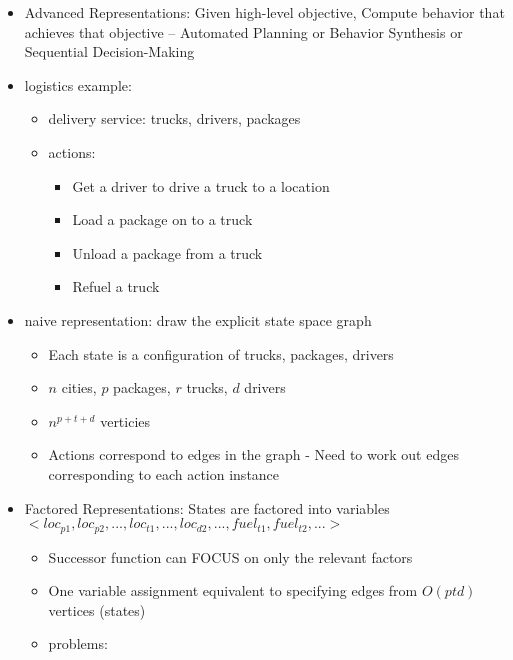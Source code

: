 \documentclass[10pt]{article}
\begin{document}
\begin{itemize}[label=\(\star\), leftmargin=1em, itemsep=-0.3em]

\item Advanced Representations: Given  high-level objective, Compute behavior that achieves that objective -- Automated Planning or Behavior Synthesis or Sequential Decision-Making
\item logistics example:
        \begin{itemize}[label=\(\star\), leftmargin=1em, itemsep=-0.2em]

            \item delivery service: trucks, drivers, packages
            \item actions:
                \begin{itemize}[label=\(\star\),  leftmargin=1em, itemsep=-0.2em]
                    \item  Get a driver to drive a truck to a location
                    \item Load a package on to a truck
                    \item Unload a package from a truck
                    \item Refuel a truck
                \end{itemize}
        \end{itemize}
\item naive representation: draw the explicit state space graph

        \begin{itemize}[label=\(\star\), leftmargin=1em, itemsep=-0.2em]
            \item Each state is a configuration of trucks, packages, drivers
            \item $n$ cities, $p$ packages, $r$ trucks, $d$ drivers
            \item $n^{p+t+d}$ verticies
            \item Actions correspond to edges in the graph - Need to work out edges corresponding to each action instance


        \end{itemize}

\item Factored Representations: States are factored into variables $<loc_{p1}, loc_{p2},..., loc_{t1},... ,  loc_{d2},..., fuel_{t1}, fuel_{t2}, ... >$

\begin{itemize}[label=\(\star\), leftmargin=1em, itemsep=-0.2em]
    \item  Successor function can FOCUS on only the relevant factors
    \item One variable assignment equivalent to specifying edges from $O(ptd)$ vertices (states)
    \item problems:



\end{itemize}
\end{itemize}
\end{document}
